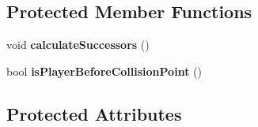 \subsection*{Protected Member Functions}
\begin{DoxyCompactItemize}
\item 
\hypertarget{class_light_ray_a1711b1964da22ce4083740adc2233780}{}void {\bfseries calculate\+Successors} ()\label{class_light_ray_a1711b1964da22ce4083740adc2233780}

\item 
\hypertarget{class_light_ray_ad2f26e29e0781597f7bf106396ba2fb7}{}bool {\bfseries is\+Player\+Before\+Collision\+Point} ()\label{class_light_ray_ad2f26e29e0781597f7bf106396ba2fb7}

\end{DoxyCompactItemize}
\subsection*{Protected Attributes}
